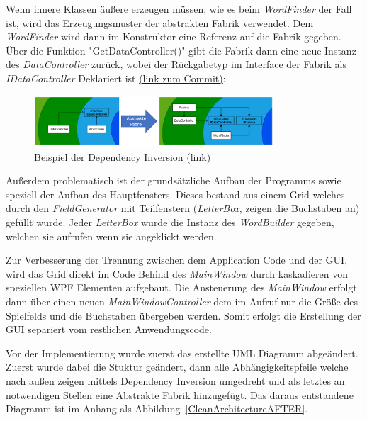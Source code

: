 Wenn innere Klassen äußere erzeugen müssen, wie es beim \textit{WordFinder} der Fall ist, wird das Erzeugungsmuster der abstrakten Fabrik verwendet. Dem \textit{WordFinder} wird dann im Konstruktor eine Referenz auf die Fabrik gegeben. Über die Funktion "GetDataController()" gibt die Fabrik dann eine neue Instanz des \textit{DataController} zurück, wobei der Rückgabetyp im Interface der Fabrik als \textit{IDataController} Deklariert ist \href{https://github.com/EinToni/Wortfinder/commit/26148d6a7ae6784b935a260371672fe16f8bbfa0}{(link zum Commit)}:

\begin{figure}[!ht]
  \centering
  \includegraphics[width=0.8\textwidth]{Bilder/AbstrakteFabrik.PNG}
  \caption[Beispiel der Dependency Inversion]{Beispiel der Dependency Inversion \href{https://github.com/EinToni/WortfinderDoku/blob/main/Bilder/AbstrakteFabrik.png}{(link)}}
  \label{Abb:AbstrakteFabrik}
\end{figure}

Außerdem problematisch ist der grundsätzliche Aufbau der Programms sowie speziell der Aufbau des Hauptfensters. Dieses bestand aus einem Grid welches durch den \textit{FieldGenerator} mit Teilfenstern (\textit{LetterBox}, zeigen die Buchstaben an) gefüllt wurde. Jeder \textit{LetterBox} wurde die Instanz des \textit{WordBuilder} gegeben, welchen sie aufrufen wenn sie angeklickt werden.


Zur Verbesserung der Trennung zwischen dem Application Code und der GUI, wird das Grid direkt im Code Behind des \textit{MainWindow} durch kaskadieren von speziellen WPF  Elementen aufgebaut. Die Ansteuerung des \textit{MainWindow} erfolgt dann über einen neuen \textit{MainWindowController} dem im Aufruf nur die Größe des Spielfelds und die Buchstaben übergeben werden. Somit erfolgt die Erstellung der GUI separiert vom restlichen Anwendungscode.





Vor der Implementierung wurde zuerst das erstellte UML Diagramm abgeändert. Zuerst wurde dabei die Stuktur geändert, dann alle Abhängigkeitspfeile welche nach außen zeigen mittels Dependency Inversion umgedreht und als letztes an notwendigen Stellen eine Abstrakte Fabrik hinzugefügt. Das daraus entstandene Diagramm ist im Anhang als Abbildung~\ref{CleanArchitectureAFTER}.


